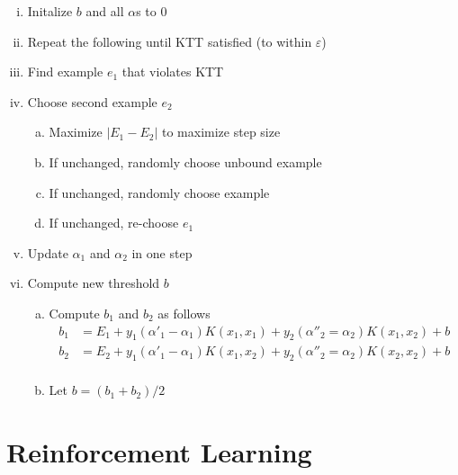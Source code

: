 \documentclass{article}
\begin{document}
			\begin{enumerate}[(i)]
				\item Initalize $b$ and all $\alpha$s to 0
				\item Repeat the following until KTT satisfied (to within $\varepsilon$)
				\item Find example $e_1$ that violates KTT
				\item Choose second example $e_2$
				\begin{enumerate}[(a)]
					\item Maximize $|E_1 - E_2|$ to maximize step size
					\item If unchanged, randomly choose unbound example
					\item If unchanged, randomly choose example
					\item If unchanged, re-choose $e_1$
					\end{enumerate}
				\item Update $\alpha_1$ and $\alpha_2$ in one step
				\item Compute new threshold $b$
				\begin{enumerate}[(a)]
					\item Compute $b_1$ and $b_2$ as follows
					\begin{align*}
						b_1 &= E_1 + y_1(\alpha'_1 - \alpha_1)K(x_1, x_1) + y_2(\alpha''_2 = \alpha_2)K(x_1, x_2) + b \\
						b_2 &= E_2 + y_1(\alpha'_1 - \alpha_1)K(x_1, x_2) + y_2(\alpha''_2 = \alpha_2)K(x_2, x_2) + b \\
						\end{align*}
					\item Let $b = (b_1 + b_2)/2$
					\end{enumerate}
				\end{enumerate}
		\clearpage

	\section{Reinforcement Learning}
\end{document}
